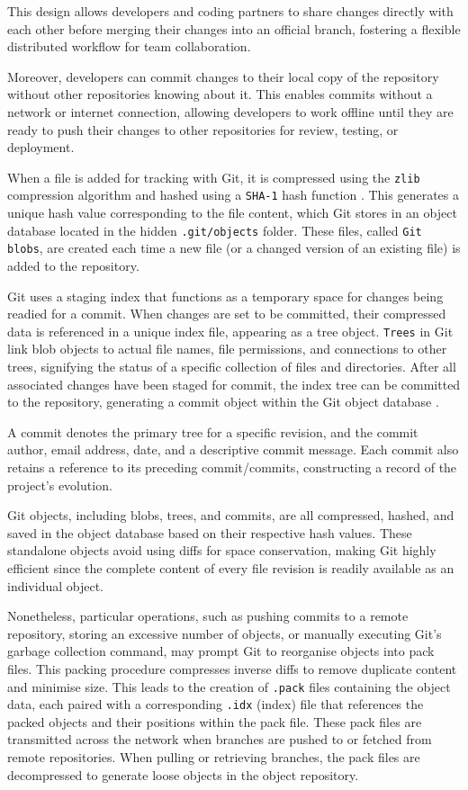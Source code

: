 This design allows developers and coding partners to share changes directly with each other before merging their changes into an official branch, fostering a flexible distributed workflow for team collaboration.
\smallskip

Moreover, developers can commit changes to their local copy of the repository without other repositories knowing about it. This enables commits without a network or internet connection, allowing developers to work offline until they are ready to push their changes to other repositories for review, testing, or deployment.
\smallskip

When a file is added for tracking with Git, it is compressed using the \lstinline{zlib} compression algorithm and hashed using a \lstinline{SHA-1} hash function \cite{stopak_2019}. This generates a unique hash value corresponding to the file content, which Git stores in an object database located in the hidden \lstinline{.git/objects} folder. These files, called \lstinline{Git blobs}, are created each time a new file (or a changed version of an existing file) is added to the repository.
\smallskip

Git uses a staging index that functions as a temporary space for changes being readied for a commit. When changes are set to be committed, their compressed data is referenced in a unique index file, appearing as a tree object. \lstinline{Trees} in Git link blob objects to actual file names, file permissions, and connections to other trees, signifying the status of a specific collection of files and directories. After all associated changes have been staged for commit, the index tree can be committed to the repository, generating a commit object within the Git object database \cite{stopak_2019}.
\smallskip

A commit denotes the primary tree for a specific revision, and the commit author, email address, date, and a descriptive commit message. Each commit also retains a reference to its preceding commit/commits, constructing a record of the project's evolution.
\smallskip

Git objects, including blobs, trees, and commits, are all compressed, hashed, and saved in the object database based on their respective hash values. These standalone objects avoid using diffs for space conservation, making Git highly efficient since the complete content of every file revision is readily available as an individual object.
\smallskip

Nonetheless, particular operations, such as pushing commits to a remote repository, storing an excessive number of objects, or manually executing Git's garbage collection command, may prompt Git to reorganise objects into pack files. This packing procedure compresses inverse diffs to remove duplicate content and minimise size. This leads to the creation of \lstinline{.pack} files containing the object data, each paired with a corresponding \lstinline{.idx} (index) file that references the packed objects and their positions within the pack file. These pack files are transmitted across the network when branches are pushed to or fetched from remote repositories. When pulling or retrieving branches, the pack files are decompressed to generate loose objects in the object repository.

